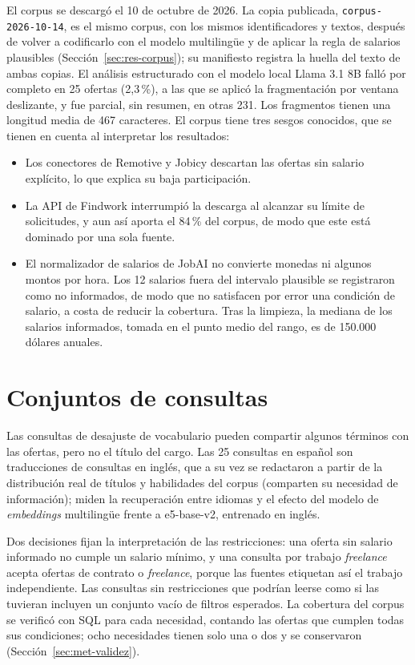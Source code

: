 El corpus se descargó el 10 de octubre de 2026. La copia publicada, \texttt{corpus-2026-10-14}, es el mismo corpus, con los mismos identificadores y textos, después de volver a codificarlo con el modelo multilingüe y de aplicar la regla de salarios plausibles (Sección~\ref{sec:res-corpus}); su manifiesto registra la huella del texto de ambas copias. El análisis estructurado con el modelo local Llama 3.1 8B falló por completo en 25 ofertas (2,3\,\%), a las que se aplicó la fragmentación por ventana deslizante, y fue parcial, sin resumen, en otras 231. Los fragmentos tienen una longitud media de 467 caracteres. El corpus tiene tres sesgos conocidos, que se tienen en cuenta al interpretar los resultados:
\begin{itemize}
    \item Los conectores de Remotive y Jobicy descartan las ofertas sin salario explícito, lo que explica su baja participación.
    \item La API de Findwork interrumpió la descarga al alcanzar su límite de solicitudes, y aun así aporta el 84\,\% del corpus, de modo que este está dominado por una sola fuente.
    \item El normalizador de salarios de JobAI no convierte monedas ni algunos montos por hora. Los 12 salarios fuera del intervalo plausible se registraron como no informados, de modo que no satisfacen por error una condición de salario, a costa de reducir la cobertura. Tras la limpieza, la mediana de los salarios informados, tomada en el punto medio del rango, es de 150.000 dólares anuales.
\end{itemize}

\section{Conjuntos de consultas}
\label{anx:consultas}

Las consultas de desajuste de vocabulario pueden compartir algunos términos con las ofertas, pero no el título del cargo. Las 25 consultas en español son traducciones de consultas en inglés, que a su vez se redactaron a partir de la distribución real de títulos y habilidades del corpus (comparten su necesidad de información); miden la recuperación entre idiomas y el efecto del modelo de \textit{embeddings} multilingüe frente a e5-base-v2, entrenado en inglés.

Dos decisiones fijan la interpretación de las restricciones: una oferta sin salario informado no cumple un salario mínimo, y una consulta por trabajo \textit{freelance} acepta ofertas de contrato o \textit{freelance}, porque las fuentes etiquetan así el trabajo independiente. Las consultas sin restricciones que podrían leerse como si las tuvieran incluyen un conjunto vacío de filtros esperados. La cobertura del corpus se verificó con SQL para cada necesidad, contando las ofertas que cumplen todas sus condiciones; ocho necesidades tienen solo una o dos y se conservaron (Sección~\ref{sec:met-validez}).

